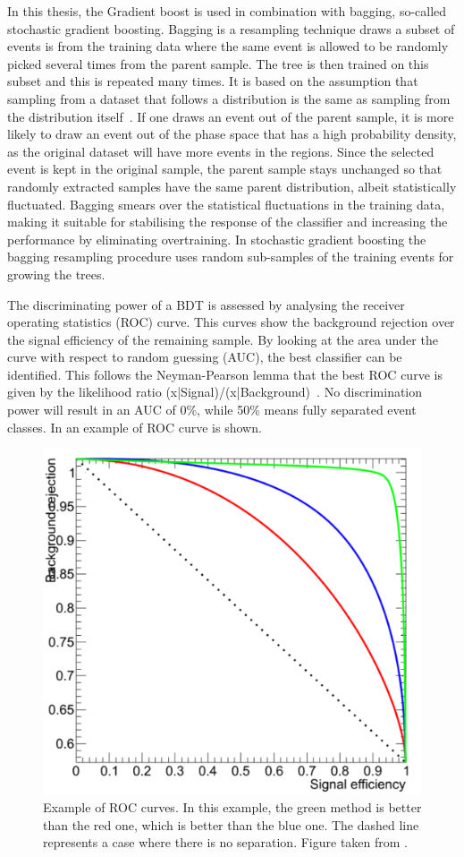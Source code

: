 In this thesis, the Gradient boost is used in combination with bagging, so-called stochastic gradient boosting. Bagging is a resampling technique draws a subset of events is  from the training data where the same event is allowed to be randomly picked several times from the parent sample. The tree is then trained on this subset and this is repeated many times. It is based on the assumption that sampling from a dataset that follows a distribution is the same as sampling from the distribution itself~\cite{Behnke:2013:DAH:2564838}. If one draws an event out of the parent sample, it is more likely to draw an event out of the phase space that has a high probability density, as the original dataset will have more events in the regions. Since the selected event is kept in the original sample, the parent sample stays unchanged so that randomly extracted samples have the same parent distribution, albeit statistically fluctuated.  Bagging smears over the statistical fluctuations in the training data, making it suitable for stabilising the response of the classifier and increasing the performance by eliminating overtraining.  In stochastic gradient boosting the bagging resampling procedure uses random sub-samples of the training events for growing the trees. 


The discriminating power of a BDT is assessed by analysing the receiver operating statistics (ROC) curve. This curves show the background rejection over the signal efficiency of the remaining sample. By looking at the area under the curve with respect to random guessing (AUC), the best classifier can be identified. This follows the Neyman-Pearson lemma that the best ROC curve is given by the likelihood ratio \like(x|Signal)/\like(x|Background)~\cite{Behnke:2013:DAH:2564838}. No discrimination power will result in an AUC of 0\%, while 50\%  means fully separated event classes. In  an example of ROC curve is shown. 
\begin{figure}[htbp]
	\centering
	\includegraphics[width=0.5\linewidth]{3_Analysis_techniques/Figures/ROC}
	\caption{Example of ROC curves. In this example, the green method is better than the red one, which is better than the blue one. The dashed line represents a case where there is no separation. Figure taken from \cite{ROC}.}
	\label{fig:roc}
\end{figure}





